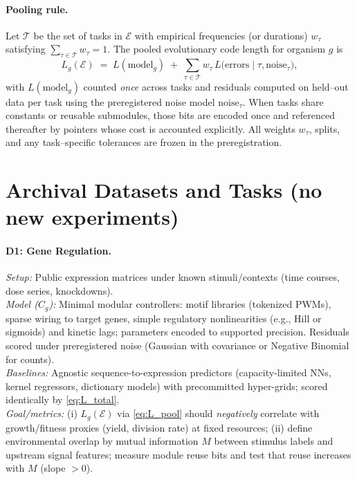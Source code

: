 \documentclass[11pt,a4paper]{article}
\begin{document}
\paragraph{Pooling rule.}
Let $\mathcal{T}$ be the set of tasks in $\mathcal{E}$ with empirical frequencies (or durations) $w_\tau$ satisfying $\sum_{\tau\in\mathcal{T}} w_\tau=1$. The pooled evolutionary code length for organism $g$ is
\begin{equation}\label{eq:L_pool}
L_g(\mathcal{E})
\;=\;
L(\text{model}_g)
\;+\;
\sum_{\tau\in\mathcal{T}}
w_\tau\,
L\big(\text{errors}\mid \tau,\text{noise}_\tau\big),
\end{equation}
with $L(\text{model}_g)$ counted \emph{once} across tasks and residuals computed on held–out data per task using the preregistered noise model $\text{noise}_\tau$. When tasks share constants or reusable submodules, those bits are encoded once and referenced thereafter by pointers whose cost is accounted explicitly. All weights $w_\tau$, splits, and any task–specific tolerances are frozen in the preregistration.

\section{Archival Datasets and Tasks (no new experiments)}

\paragraph{D1: Gene Regulation.}
\emph{Setup:} Public expression matrices under known stimuli/contexts (time courses, dose series, knockdowns).\\
\emph{Model (\(C_g\)):} Minimal modular controllers: motif libraries (tokenized PWMs), sparse wiring to target genes, simple regulatory nonlinearities (e.g., Hill or sigmoids) and kinetic lags; parameters encoded to supported precision. Residuals scored under preregistered noise (Gaussian with covariance or Negative Binomial for counts).\\
\emph{Baselines:} Agnostic sequence-to-expression predictors (capacity-limited NNs, kernel regressors, dictionary models) with precommitted hyper-grids; scored identically by \eqref{eq:L_total}.\\
\emph{Goal/metrics:} (i) $L_g(\mathcal{E})$ via \eqref{eq:L_pool} should \emph{negatively} correlate with growth/fitness proxies (yield, division rate) at fixed resources; (ii) define environmental overlap by mutual information $M$ between stimulus labels and upstream signal features; measure module reuse bits and test that reuse increases with $M$ (slope $>0$).
\end{document}
